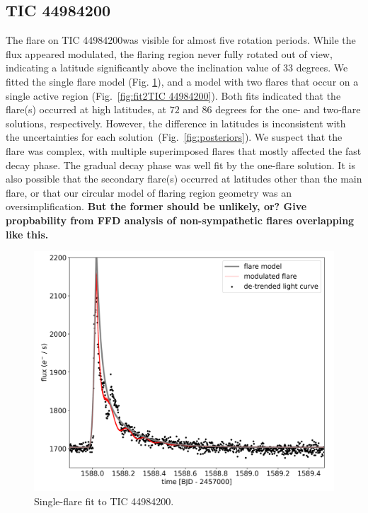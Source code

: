 \documentclass[fleqn,usenatbib,letters]{mnras}%
\newcommand{\FB}{TIC 44984200} %
\begin{document}
\subsection{\FB}
The flare on \FB was visible for almost five rotation periods. While the flux appeared modulated, the flaring region never fully rotated out of view, indicating a latitude significantly above the inclination value of 33 degrees. We fitted the single flare model (Fig. \ref{fig:fit\FB}), and a model with two flares that occur on a single active region (Fig.~\ref{fig:fit2\FB}). Both fits indicated that the flare(s) occurred at high latitudes, at $72$ and $86$ degrees for the one- and two-flare solutions, respectively. However, the difference in latitudes is inconsistent with the uncertainties for each solution~(Fig.~\ref{fig:posteriors}). We suspect that the flare was complex, with multiple superimposed flares that mostly affected the fast decay phase. The gradual decay phase was well fit by the one-flare solution. It is also possible that the secondary flare(s) occurred at latitudes other than the main flare, or that our circular model of flaring region geometry was an oversimplification. \textbf{But the former should be unlikely, or? Give propbability from FFD analysis of non-sympathetic flares overlapping like this.}
\begin{figure}
	\includegraphics[width=\columnwidth]{figures/02_08_2020_17_44_TIC44984200_flarefit_50retrievals.png}
    \caption{Single-flare fit to \FB.}
    \label{fig:fit\FB}
\end{figure}
\end{document}

